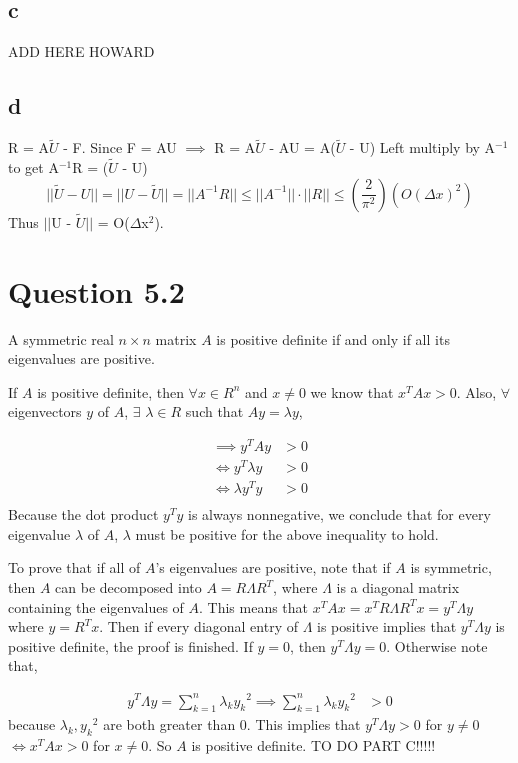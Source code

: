 \documentclass[11pt]{amsart}
\begin{document}
\subsection*{c}
ADD HERE HOWARD
\subsection*{d}
R = A$\tilde{U}$ - F. Since F = AU $\implies$ R = A$\tilde{U}$ - AU = A($\tilde{U}$ - U)
\newline
Left multiply by A$^{-1}$ to get A$^{-1}$R = ($\tilde{U}$ - U)
\[
||\tilde{U} - U|| = || U - \tilde{U}|| = ||A^{-1}R|| \le ||A^{-1}||\cdot||R|| \le (\frac{2}{\pi^2})(O(\Delta x)^2)
\]
Thus $||$U - $\tilde{U}$$||$ = O($\Delta$x$^{2}$).
\section*{Question 5.2}
A symmetric real $n \times n$ matrix $A$ is positive definite if and only if all its eigenvalues are positive.

If $A$ is positive definite, then $\forall x \in R^n$ and $x \ne 0$ we know that $x^TAx > 0$. Also, $\forall$ eigenvectors $y$ of $A$, $\exists$ $\lambda \in R$ such that $Ay = \lambda y$,

\begin{align*}
\implies y^TAy &> 0\\
\iff y^T\lambda y &> 0\\
\iff \lambda y^Ty &>0\\ 
\end{align*}
Because the dot product $y^Ty$ is always nonnegative, we conclude that for every eigenvalue $\lambda$ of $A$, $\lambda$ must be positive for the above inequality to hold.

To prove that if all of $A$'s eigenvalues are positive, note that if $A$ is symmetric, then $A$ can be decomposed into $A = R\Lambda R^T$, where $\Lambda$ is a diagonal matrix containing the eigenvalues of $A$. This means that $x^TAx = x^TR\Lambda R^Tx = y^T\Lambda y$ where $y = R^Tx$. Then if every diagonal entry of $\Lambda$ is positive implies that $y^T\Lambda y$ is positive definite, the proof is finished.
If $y=0$, then $y^T\Lambda y = 0$. Otherwise note that,

\begin{align*}
y^T\Lambda y = \sum_{k=1}^{n} \lambda _k {y_k}^2 \implies \sum_{k=1}^{n} \lambda _k {y_k}^2 & > 0 
\end{align*}
because $\lambda _k, {y_k}^2$ are both greater than 0. This implies that $y^T \Lambda y > 0$ for $y \ne 0$ $\iff x^TAx > 0$ for $x \ne 0 $. So $A$ is positive definite. TO DO PART C!!!!!
\newline
\newline
\end{document}
